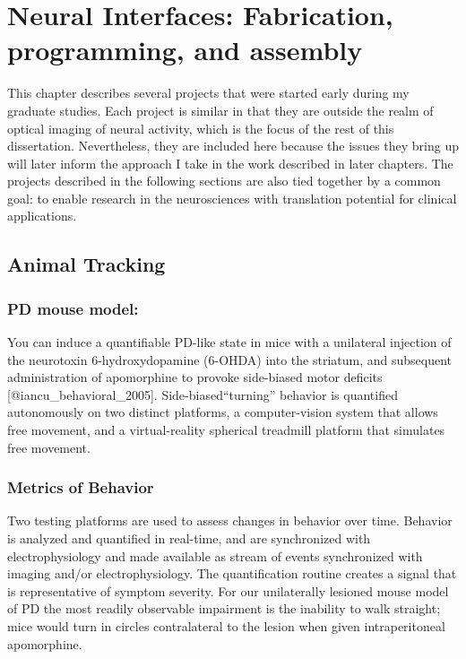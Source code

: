 \chapter{Neural Interfaces: Fabrication, programming, and
assembly}
\label{neural-interfaces-fabrication-programming-and-assembly}
\thispagestyle{myheadings}

\graphicspath{{2_Body/Figures/}}

This chapter describes several projects that were started early during
my graduate studies. Each project is similar in that they are outside
the realm of optical imaging of neural activity, which is the focus of
the rest of this dissertation. Nevertheless, they are included here
because the issues they bring up will later inform the approach I take
in the work described in later chapters. The projects described in the
following sections are also tied together by a common goal: to enable
research in the neurosciences with translation potential for clinical
applications.

\section{Animal Tracking}\label{animal-tracking}

\subsection{PD mouse model:}\label{pd-mouse-model}

You can induce a quantifiable PD-like state in mice with a unilateral
injection of the neurotoxin 6-hydroxydopamine (6-OHDA) into the
striatum, and subsequent administration of apomorphine to provoke
side-biased motor deficits {[}@iancu\_behavioral\_2005{]}.
Side-biased``turning'' behavior is quantified autonomously on two
distinct platforms, a computer-vision system that allows free movement,
and a virtual-reality spherical treadmill platform that simulates free
movement.

\subsection{Metrics of Behavior}\label{metrics-of-behavior}

Two testing platforms are used to assess changes in behavior over time.
Behavior is analyzed and quantified in real-time, and are synchronized
with electrophysiology and made available as stream of events
synchronized with imaging and/or electrophysiology. The quantification
routine creates a signal that is representative of symptom severity. For
our unilaterally lesioned mouse model of PD the most readily observable
impairment is the inability to walk straight; mice would turn in circles
contralateral to the lesion when given intraperitoneal apomorphine.

